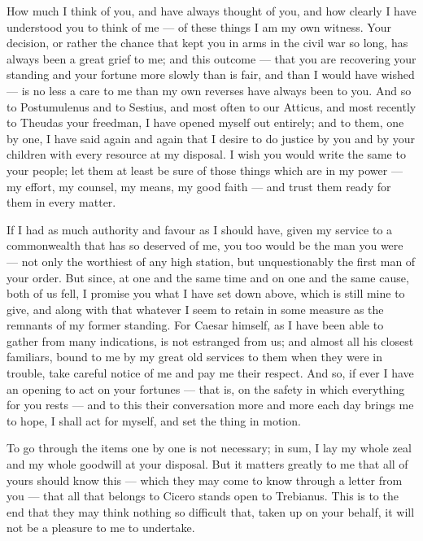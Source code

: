 

 How much I think of you, and have always thought of you, and how clearly I have understood you to think of me --- of these things I am my own witness. Your decision, or rather the chance that kept you in arms in the civil war so long, has always been a great grief to me; and this outcome --- that you are recovering your standing and your fortune more slowly than is fair, and than I would have wished --- is no less a care to me than my own reverses have always been to you. And so to Postumulenus and to Sestius, and most often to our Atticus, and most recently to Theudas your freedman, I have opened myself out entirely; and to them, one by one, I have said again and again that I desire to do justice by you and by your children with every resource at my disposal. I wish you would write the same to your people; let them at least be sure of those things which are in my power --- my effort, my counsel, my means, my good faith --- and trust them ready for them in every matter.

 If I had as much authority and favour as I should have, given my service to a commonwealth that has so deserved of me, you too would be the man you were --- not only the worthiest of any high station, but unquestionably the first man of your order. But since, at one and the same time and on one and the same cause, both of us fell, I promise you what I have set down above, which is still mine to give, and along with that whatever I seem to retain in some measure as the remnants of my former standing. For Caesar himself, as I have been able to gather from many indications, is not estranged from us; and almost all his closest familiars, bound to me by my great old services to them when they were in trouble, take careful notice of me and pay me their respect. And so, if ever I have an opening to act on your fortunes --- that is, on the safety in which everything for you rests --- and to this their conversation more and more each day brings me to hope, I shall act for myself, and set the thing in motion.

 To go through the items one by one is not necessary; in sum, I lay my whole zeal and my whole goodwill at your disposal. But it matters greatly to me that all of yours should know this --- which they may come to know through a letter from you --- that all that belongs to Cicero stands open to Trebianus. This is to the end that they may think nothing so difficult that, taken up on your behalf, it will not be a pleasure to me to undertake.

